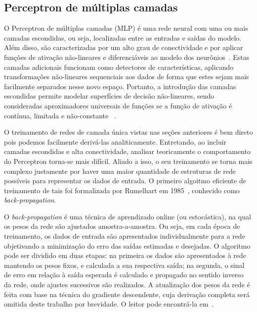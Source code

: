 \documentclass[conference]{IEEEtran}
\begin{document}
	\subsection{Perceptron de múltiplas camadas}
	
	O Perceptron de múltiplas camadas (MLP) é uma rede neural com uma ou mais camadas escondidas, ou seja, localizadas entre as entradas e saídas do modelo. Além disso, são caracterizadas por um alto grau de conectividade e por aplicar funções de ativação não-lineares e diferenciáveis ao modelo dos neurônios~\cite{haykin2007neural}. Estas camadas adicionais funcionam como detectores de características, aplicando transformações não-lineares sequenciais aos dados de forma que estes sejam mais facilmente separados nesse novo espaço. Portanto, a introdução das camadas escondidas permite modelar superfícies de decisão não-lineares, sendo consideradas aproximadores universais de funções se a função de ativação é contínua, limitada e não-constante ~\cite{hornik1989multilayer}.
		
	O treinamento de redes de camada única vistas nas seções anteriores é bem direto pois podemos facilmente derivá-las analiticamente. Entretando, ao incluir camadas escondidas e alta conectividade, analisar teoricamente o comportamento do Perceptron torna-se mais difícil. Aliado a isso, o seu treinamento se torna mais complexo justamente por haver uma maior quantidade de estruturas de rede possíveis para representar os dados de entrada. O primeiro algoitmo eficiente de treinamento de tais foi formalizada por Rumelhart em 1985~\cite{rumelhart1985learning}, conhecido como \textit{back-propagation}.    
	
	O \textit{back-propagation} é uma técnica de aprendizado online (ou estocástica), na qual os pesos da rede são ajustados amostra-a-amostra. Ou seja, em cada época de treinamento, os dados de entrada são apresentados individualmente para a rede objetivando a minimização do erro das saídas estimadas e desejadas. O algoritmo pode ser dividido em duas etapas: na primeira os dados são apresentados à rede mantendo os pesos fixos, e calculada a sua respectiva saída; na segunda, o sinal de erro em relação à saída esperada é calculado e propagado no sentido inverso da rede, onde ajustes sucessivos são realizados. A atualização dos pesos da rede é feita com base na técnica do gradiente descendente, cuja derivação completa será omitida deste trabalho por brevidade. O leitor pode encontrá-la em~\cite{rumelhart1985learning, haykin2007neural}. 
	
\end{document}
